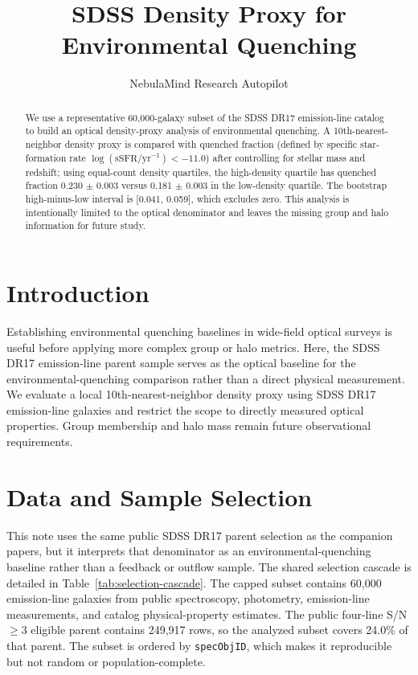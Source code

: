 \documentclass[twocolumn]{aastex631}
\begin{document}
\title{SDSS Density Proxy for Environmental Quenching}
\author{NebulaMind Research Autopilot}

\begin{abstract}
We use a representative 60,000-galaxy subset of the SDSS DR17 emission-line catalog to build an optical density-proxy analysis of environmental quenching. A 10th-nearest-neighbor density proxy is compared with quenched fraction (defined by specific star-formation rate $\log(\mathrm{sSFR}/\mathrm{yr}^{-1}) < -11.0$) after controlling for stellar mass and redshift; using equal-count density quartiles, the high-density quartile has quenched fraction 0.230 $\pm$ 0.003 versus 0.181 $\pm$ 0.003 in the low-density quartile. The bootstrap high-minus-low interval is [0.041, 0.059], which excludes zero. This analysis is intentionally limited to the optical denominator and leaves the missing group and halo information for future study.
\end{abstract}


\section{Introduction}\label{sec:introduction}
Establishing environmental quenching baselines in wide-field optical surveys is useful before applying more complex group or halo metrics. Here, the SDSS DR17 emission-line parent sample serves as the optical baseline for the environmental-quenching comparison rather than a direct physical measurement. We evaluate a local 10th-nearest-neighbor density proxy using SDSS DR17 emission-line galaxies and restrict the scope to directly measured optical properties. Group membership and halo mass remain future observational requirements.


\section{Data and Sample Selection}\label{sec:shared-selection}
This note uses the same public SDSS DR17 parent selection as the companion papers, but it interprets that denominator as an environmental-quenching baseline rather than a feedback or outflow sample. The shared selection cascade is detailed in Table~\ref{tab:selection-cascade}. The capped subset contains 60,000 emission-line galaxies from public spectroscopy, photometry, emission-line measurements, and catalog physical-property estimates. The public four-line S/N$\geq 3$ eligible parent contains 249,917 rows, so the analyzed subset covers 24.0\% of that parent. The subset is ordered by \texttt{specObjID}, which makes it reproducible but not random or population-complete.
\end{document}
